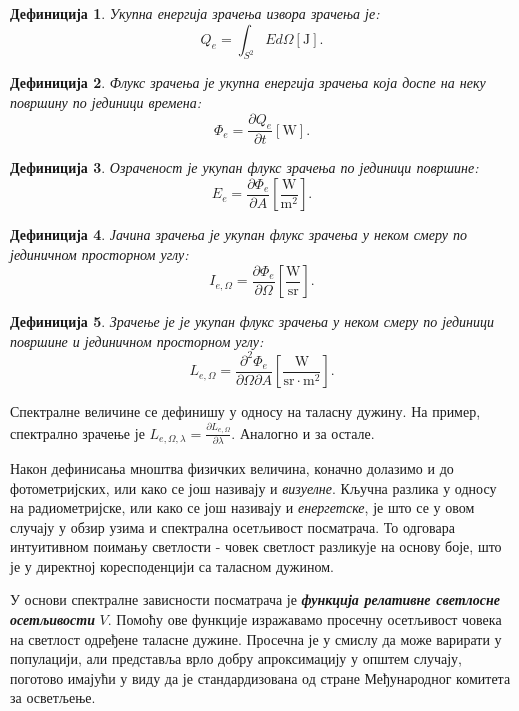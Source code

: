 \documentclass[12pt, a4paper, twoside]{book}
\numberwithin{equation}{chapter}
\numberwithin{theorem}{section}
\newtheorem{definition}{Дефиниција}
\numberwithin{definition}{section}
\numberwithin{definitionChapter}{chapter}
\begin{document}
\begin{definition}
	Укупна енергија зрачења извора зрачења је: $$Q_e = \int_{S^2} E d\Omega \left[\mathrm{J}\right].$$
\end{definition}

\begin{definition}
	Флукс зрачења је укупна енергија зрачења која доспе на неку површину по јединици времена:
	$$\Phi_e = \frac{\partial Q_e}{\partial t} \left[\mathrm{W}\right].$$
\end{definition}

\begin{definition}
	Озраченост је укупан флукс зрачења по јединици површине:
	$$E_e = \frac{\partial \Phi_e}{\partial A} \left[\mathrm{\frac{W}{m^2}}\right].$$
\end{definition}

\begin{definition}
	Јачина зрачења је укупан флукс зрачења у неком смеру по јединичном просторном углу:
	$$I_{e, \Omega} = \frac{\partial \Phi_e}{\partial \Omega} \left[\mathrm{\frac{W}{sr}}\right].$$
\end{definition}

\begin{definition}
	Зрачење је је укупан флукс зрачења у неком смеру по јединици површине и јединичном просторном углу:
	$$L_{e, \Omega} = \frac{\partial^2 \Phi_e}{\partial \Omega \partial A} \left[\mathrm{\frac{W}{sr \cdot m^2}}\right].$$
\end{definition}

Спектралне величине се дефинишу у односу на таласну дужину. На пример, спектрално зрачење
је $L_{e, \Omega, \lambda} = \frac{\partial L_{e, \Omega}}{\partial \lambda}$.
Аналогно и за остале.

Након дефинисања мноштва физичких величина, коначно долазимо и до фотометријских, или како се
још називају и \textit{визуелне}. Кључна разлика у односу на радиометријске, или како се још
називају и \textit{енергетске}, је што се у овом случају у обзир узима и спектрална
осетљивост посматрача. То одговара интуитивном поимању светлости - човек светлост разликује на
основу боје, што је у директној коресподенцији са таласном дужином.

У основи спектралне зависности посматрача је \textbf{\textit{функција релативне светлосне осетљивости}} $V$.
Помоћу ове функције изражавамо просечну осетљивост човека на светлост одређене таласне дужине.
Просечна је у смислу да може варирати у популацији, али представља врло добру апроксимацију
у општем случају, поготово имајући у виду да је стандардизована од стране Међународног комитета
за осветљење.
\end{document}
